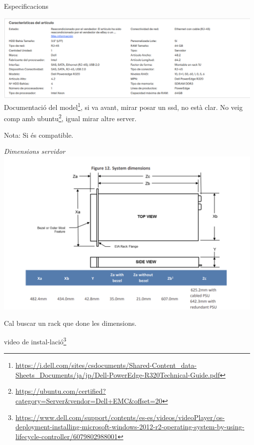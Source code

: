 \documentclass[
  10pt,
]{krantz}
\DeclareRobustCommand{\href}[2]{#2\footnote{\url{#1}}}
\begin{document}
Especificacions

\includegraphics{imatges/server_hp.png} \href{https://i.dell.com/sites/csdocuments/Shared-Content_data-Sheets_Documents/ja/jp/Dell-PowerEdge-R320Technical-Guide.pdf}{Documentació del model}, si va avant, mirar posar un ssd, no està clar. No veig comp amb \href{https://ubuntu.com/certified?category=Server\&vendor=Dell+EMC\&offset=20}{ubuntu}, igual mirar altre server.

Nota: Si és compatible.

\emph{Dimensions servidor} \includegraphics{imatges/dimserver.png}

Cal buscar un rack que done les dimensions.

\href{https://www.dell.com/support/contents/es-es/videos/videoPlayer/os-deployment-installing-microsoft-windows-2012-r2-operating-system-by-using-lifecycle-controller/6079802988001}{video de instal-lació}
\end{document}
